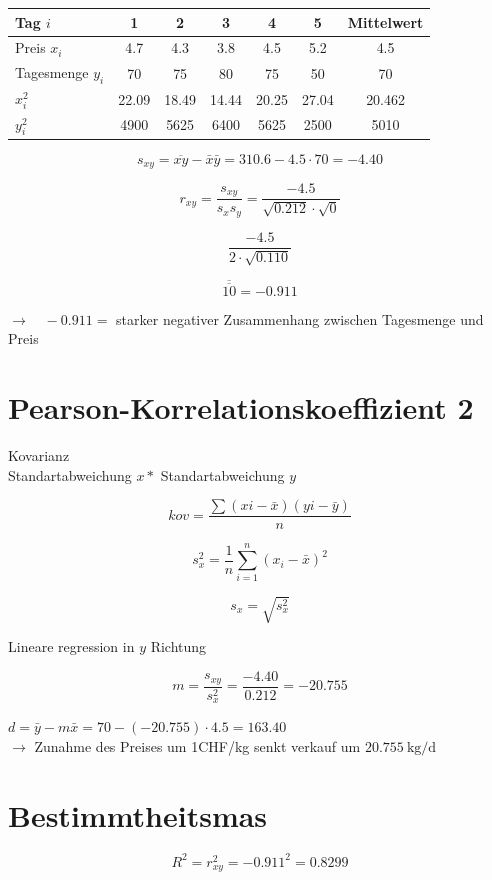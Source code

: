 \documentclass[10pt]{article}
\begin{document}
{\begin{center}
\begin{tabular}{|l|c|c|c|c|c|c|}
\hline
Tag $i$ & 1 & 2 & 3 & 4 & 5 & Mittelwert \\
\hline
Preis $x_{i}$ & 4.7 & 4.3 & 3.8 & 4.5 & 5.2 & 4.5 \\
\hline
Tagesmenge $y_{i}$ & 70 & 75 & 80 & 75 & 50 & 70 \\
\hline
$x_{i}^{2}$ & 22.09 & 18.49 & 14.44 & 20.25 & 27.04 & 20.462 \\
\hline
$y_{i}^{2}$ & 4900 & 5625 & 6400 & 5625 & 2500 & 5010 \\
\hline
\end{tabular}
\end{center}

$$
s_{x y}=\overline{x y}-\bar{x} \bar{y}=310.6-4.5 \cdot 70=-4.40
$$

$$
r_{x y}=\frac{s_{x y}}{s_{x} s_{y}}=\frac{-4.5}{\sqrt{0.212} \cdot \sqrt{0}}
$$

$$
\frac{-4.5}{2 \cdot \sqrt{0.110}}
$$

$$
\overline{\overline{10}}=-0.911
$$

$\rightarrow \quad-0.911=$ starker negativer Zusammenhang zwischen Tagesmenge und Preis

\section*{Pearson-Korrelationskoeffizient 2}
Kovarianz\\
Standartabweichung $x *$ Standartabweichung $y$

$$
k o v=\frac{\sum(x i-\bar{x})(y i-\bar{y})}{n}
$$

$$
s_{x}^{2}=\frac{1}{n} \sum_{i=1}^{n}\left(x_{i}-\bar{x}\right)^{2}
$$

$$
s_{x}=\sqrt{s_{x}^{2}}
$$

Lineare regression in $y$ Richtung

$$
m=\frac{s_{x y}}{s_{x}^{2}}=\frac{-4.40}{0.212}=-20.755
$$

$d=\bar{y}-m \bar{x}=70-(-20.755) \cdot 4.5=163.40$\\
$\rightarrow$ Zunahme des Preises um 1CHF/kg senkt verkauf um $20.755 \mathrm{~kg} / \mathrm{d}$

\section*{Bestimmtheitsmas}
$$
R^{2}=r_{x y}^{2}=-0.911^{2}=0.8299
$$

}
\end{document}
